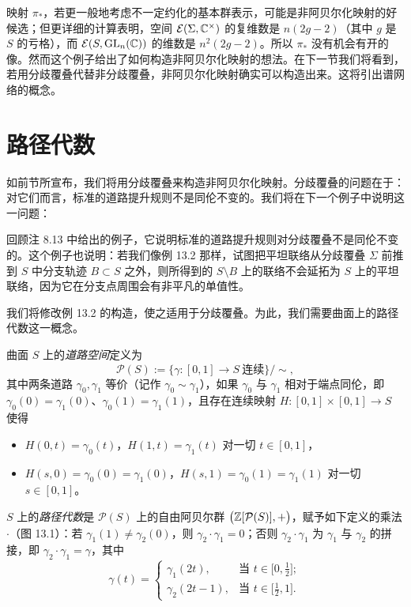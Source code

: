 映射 $\pi_*$，若更一般地考虑不一定约化的基本群表示，可能是非阿贝尔化映射的好候选；但更详细的计算表明，空间 $\mathcal{E}(\Sigma,\mathbb{C}^\times)$ 的复维数是 $n(2g-2)$（其中 $g$ 是 $S$ 的亏格），而 $\mathcal{E}(S,\operatorname{GL}_n(\mathbb{C}))$ 的维数是 $n^2(2g-2)$。所以 $\pi_*$ 没有机会有开的像。然而这个例子给出了如何构造非阿贝尔化映射的想法。在下一节我们将看到，若用分歧覆叠代替非分歧覆叠，非阿贝尔化映射确实可以构造出来。这将引出谱网络的概念。

\section{路径代数}

如前节所宣布，我们将用分歧覆叠来构造非阿贝尔化映射。分歧覆叠的问题在于：对它们而言，标准的道路提升规则不是同伦不变的。我们将在下一个例子中说明这一问题：

\begin{example}[13.3]
回顾注 8.13 中给出的例子，它说明标准的道路提升规则对分歧覆叠不是同伦不变的。这个例子也说明：若我们像例 13.2 那样，试图把平坦联络从分歧覆叠 $\Sigma$ 前推到 $S$ 中分支轨迹 $B\subset S$ 之外，则所得到的 $S\setminus B$ 上的联络不会延拓为 $S$ 上的平坦联络，因为它在分支点周围会有非平凡的单值性。
\end{example}

我们将修改例 13.2 的构造，使之适用于分歧覆叠。为此，我们需要曲面上的路径代数这一概念。

\begin{definition}[13.4]
曲面 $S$ 上的\emph{道路空间}定义为
\[
\mathcal{P}(S):=\bigl\{\gamma\colon[0,1]\to S\ \text{连续}\bigr\}/\sim,
\]
其中两条道路 $\gamma_0,\gamma_1$ 等价（记作 $\gamma_0\sim\gamma_1$），如果 $\gamma_0$ 与 $\gamma_1$ 相对于端点同伦，即 $\gamma_0(0)=\gamma_1(0)$、$\gamma_0(1)=\gamma_1(1)$，且存在连续映射 $H\colon[0,1]\times[0,1]\to S$ 使得
\begin{itemize}
\item $H(0,t)=\gamma_0(t)$，$H(1,t)=\gamma_1(t)$ 对一切 $t\in[0,1]$，
\item $H(s,0)=\gamma_0(0)=\gamma_1(0)$，$H(s,1)=\gamma_0(1)=\gamma_1(1)$ 对一切 $s\in[0,1]$。
\end{itemize}
\end{definition}

\begin{definition}[13.5]
$S$ 上的\emph{路径代数}是 $\mathcal{P}(S)$ 上的自由阿贝尔群 $\bigl(\mathbb{Z}[\mathcal{P}(S)],+\bigr)$，赋予如下定义的乘法 $\cdot$（图 13.1）：若 $\gamma_1(1)\neq\gamma_2(0)$，则 $\gamma_2\cdot\gamma_1=0$；否则 $\gamma_2\cdot\gamma_1$ 为 $\gamma_1$ 与 $\gamma_2$ 的拼接，即 $\gamma_2\cdot\gamma_1=\gamma$，其中
\[
\gamma(t)=
\begin{cases}
\gamma_1(2t), & \text{当 } t\in\bigl[0,\tfrac12\bigr];\\[3pt]
\gamma_2(2t-1), & \text{当 } t\in\bigl[\tfrac12,1\bigr].
\end{cases}
\]
\end{definition}

